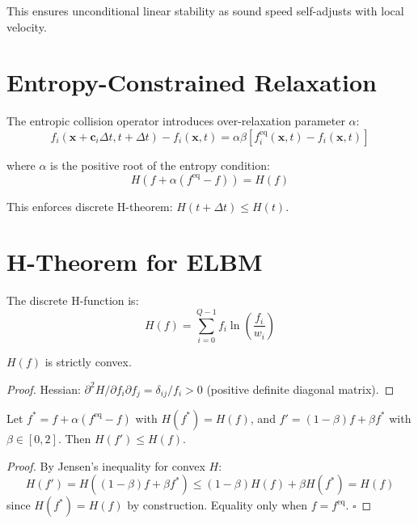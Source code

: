 This ensures unconditional linear stability as sound speed self-adjusts with local velocity.

\section{Entropy-Constrained Relaxation}

The entropic collision operator introduces over-relaxation parameter $\alpha$:
\begin{equation}
f_i(\mathbf{x} + \mathbf{c}_i\Delta t, t + \Delta t) - f_i(\mathbf{x}, t) = \alpha\beta[f_i^{\mathrm{eq}}(\mathbf{x}, t) - f_i(\mathbf{x}, t)]
\end{equation}

where $\alpha$ is the positive root of the entropy condition:
\begin{equation}
H(f + \alpha(f^{\mathrm{eq}} - f)) = H(f)
\end{equation}

This enforces discrete H-theorem: $H(t + \Delta t) \leq H(t)$.

\section{H-Theorem for ELBM}

\begin{definition}
The discrete H-function is:
\begin{equation}
H(f) = \sum_{i=0}^{Q-1} f_i \ln\left(\frac{f_i}{w_i}\right)
\end{equation}
\end{definition}

\begin{lemma}
$H(f)$ is strictly convex.
\end{lemma}
\begin{proof}
Hessian: $\partial^2 H/\partial f_i \partial f_j = \delta_{ij}/f_i > 0$ (positive definite diagonal matrix).
\end{proof}

\begin{theorem}[H-Theorem]
Let $f^* = f + \alpha(f^{\mathrm{eq}} - f)$ with $H(f^*) = H(f)$, and $f' = (1-\beta)f + \beta f^*$ with $\beta \in [0,2]$. Then $H(f') \leq H(f)$.
\end{theorem}

\begin{proof}
By Jensen's inequality for convex $H$:
\begin{equation}
H(f') = H((1-\beta)f + \beta f^*) \leq (1-\beta)H(f) + \beta H(f^*) = H(f)
\end{equation}
since $H(f^*) = H(f)$ by construction. Equality only when $f = f^{\mathrm{eq}}$. $\square$
\end{proof}

